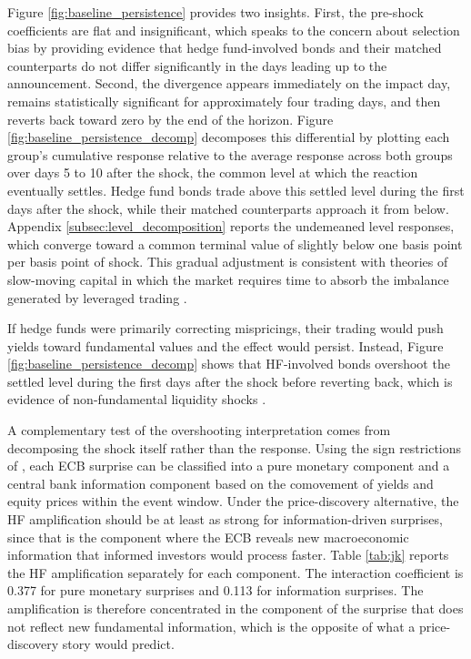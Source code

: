 \documentclass[english, 11pt, oneside]{article}
\begin{document}
Figure \ref{fig:baseline_persistence} provides two insights. First, the pre-shock coefficients are flat and insignificant, which speaks to the concern about selection bias by providing evidence that hedge fund-involved bonds and their matched counterparts do not differ significantly in the days leading up to the announcement. Second, the divergence appears immediately on the impact day, remains statistically significant for approximately four trading days, and then reverts back toward zero by the end of the horizon. Figure \ref{fig:baseline_persistence_decomp} decomposes this differential by plotting each group's cumulative response relative to the average response across both groups over days 5 to 10 after the shock, the common level at which the reaction eventually settles. Hedge fund bonds trade above this settled level during the first days after the shock, while their matched counterparts approach it from below. Appendix \ref{subsec:level_decomposition} reports the undemeaned level responses, which converge toward a common terminal value of slightly below one basis point per basis point of shock. This gradual adjustment is consistent with theories of slow-moving capital in which the market requires time to absorb the imbalance generated by leveraged trading \citep{duffie2010, mitchell2007}.

If hedge funds were primarily correcting mispricings, their trading would push yields toward fundamental values and the effect would persist. Instead, Figure \ref{fig:baseline_persistence_decomp} shows that HF-involved bonds overshoot the settled level during the first days after the shock before reverting back, which is evidence of non-fundamental liquidity shocks \citep{coval2007}.

A complementary test of the overshooting interpretation comes from decomposing the shock itself rather than the response. Using the sign restrictions of \citet{jarocinski2020}, each ECB surprise can be classified into a pure monetary component and a central bank information component based on the comovement of yields and equity prices within the event window. Under the price-discovery alternative, the HF amplification should be at least as strong for information-driven surprises, since that is the component where the ECB reveals new macroeconomic information that informed investors would process faster. Table \ref{tab:jk} reports the HF amplification separately for each component. The interaction coefficient is 0.377 for pure monetary surprises and 0.113 for information surprises. The amplification is therefore concentrated in the component of the surprise that does not reflect new fundamental information, which is the opposite of what a price-discovery story would predict.
\end{document}
